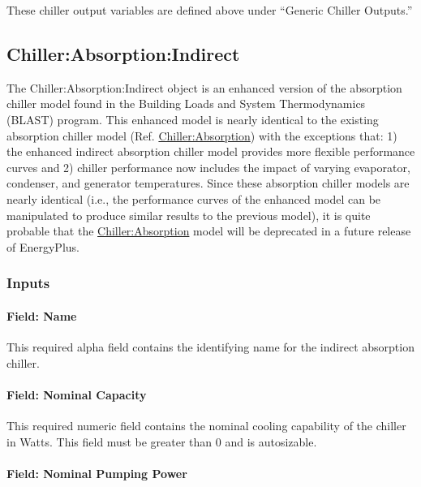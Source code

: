 These chiller output variables are defined above under ``Generic Chiller Outputs.''

\subsection{Chiller:Absorption:Indirect}\label{chillerabsorptionindirect}

The Chiller:Absorption:Indirect object is an enhanced version of the absorption chiller model found in the Building Loads and System Thermodynamics (BLAST) program. This enhanced model is nearly identical to the existing absorption chiller model (Ref. \hyperref[chillerabsorption]{Chiller:Absorption}) with the exceptions that: 1) the enhanced indirect absorption chiller model provides more flexible performance curves and 2) chiller performance now includes the impact of varying evaporator, condenser, and generator temperatures. Since these absorption chiller models are nearly identical (i.e., the performance curves of the enhanced model can be manipulated to produce similar results to the previous model), it is quite probable that the \hyperref[chillerabsorption]{Chiller:Absorption} model will be deprecated in a future release of EnergyPlus.

\subsubsection{Inputs}\label{inputs-1-033}

\paragraph{Field: Name}\label{field-name-1-032}

This required alpha field contains the identifying name for the indirect absorption chiller.

\paragraph{Field: Nominal Capacity}\label{field-nominal-capacity-1-001}

This required numeric field contains the nominal cooling capability of the chiller in Watts. This field must be greater than 0 and is autosizable.

\paragraph{Field: Nominal Pumping Power}\label{field-nominal-pumping-power-1}

